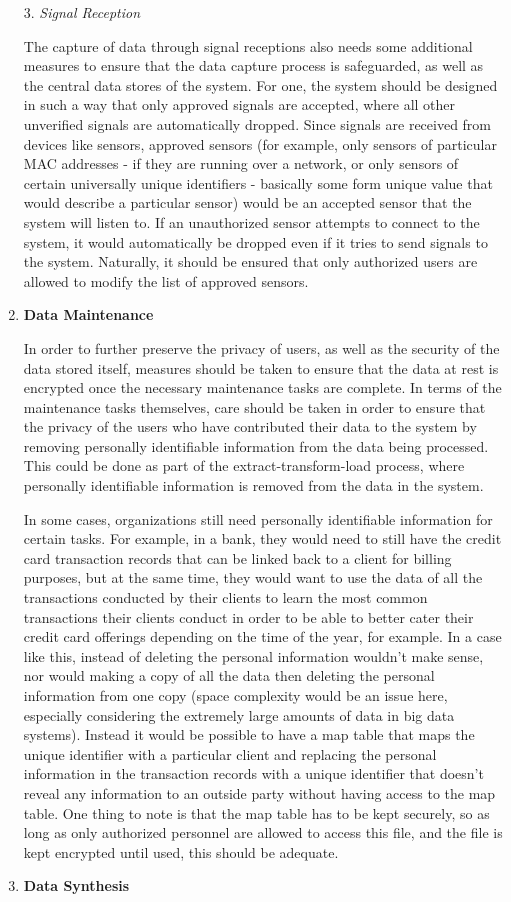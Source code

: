 \documentclass{sigchi}
\begin{document}
\begin{enumerate}
3. \textit{Signal Reception}

The capture of data through signal receptions also needs some additional measures to ensure that the data capture process is safeguarded, as well as the central data stores of the system. For one, the system should be designed in such a way that only approved signals are accepted, where all other unverified signals are automatically dropped. Since signals are received from devices like sensors, approved sensors (for example, only sensors of particular MAC addresses - if they are running over a network, or only sensors of certain universally unique identifiers - basically some form unique value that would describe a particular sensor) would be an accepted sensor that the system will listen to. If an unauthorized sensor attempts to connect to the system, it would automatically be dropped even if it tries to send signals to the system. Naturally, it should be ensured that only authorized users are allowed to modify the list of approved sensors.

\item \textbf{Data Maintenance}

In order to further preserve the privacy of users, as well as the security of the data stored itself, measures should be taken to ensure that the data at rest is encrypted once the necessary maintenance tasks are complete. In terms of the maintenance tasks themselves, care should be taken in order to ensure that the privacy of the users who have contributed their data to the system by removing personally identifiable information from the data being processed. This could be done as part of the extract-transform-load process, where personally identifiable information is removed from the data in the system.

In some cases, organizations still need personally identifiable information for certain tasks. For example, in a bank, they would need to still have the credit card transaction records that can be linked back to a client for billing purposes, but at the same time, they would want to use the data of all the transactions conducted by their clients to learn the most common transactions their clients conduct in order to be able to better cater their credit card offerings depending on the time of the year, for example. In a case like this, instead of deleting the personal information wouldn't make sense, nor would making a copy of all the data then deleting the personal information from one copy (space complexity would be an issue here, especially considering the extremely large amounts of data in big data systems). Instead it would be possible to have a map table that maps the unique identifier with a particular client and replacing the personal information in the transaction records with a unique identifier that doesn't reveal any information to an outside party without having access to the map table. One thing to note is that the map table has to be kept securely, so as long as only authorized personnel are allowed to access this file, and the file is kept encrypted until used, this should be adequate.
\item \textbf{Data Synthesis}


\end{enumerate}
\end{document}
